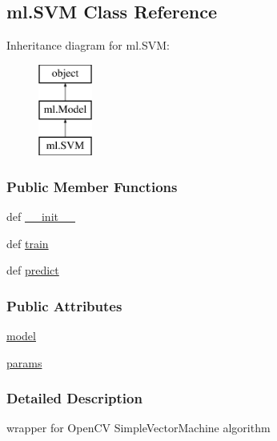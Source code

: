 \hypertarget{classml_1_1SVM}{\subsection{ml.\-S\-V\-M Class Reference}
\label{classml_1_1SVM}
}
Inheritance diagram for ml.\-S\-V\-M\-:\begin{figure}[H]
\begin{center}
\leavevmode
\includegraphics[height=3.000000cm]{classml_1_1SVM}
\end{center}
\end{figure}
\subsubsection*{Public Member Functions}
\begin{DoxyCompactItemize}
\item 
def \hyperlink{classml_1_1SVM_a9979e4fb45c9bded660ba85c52c8f89b}{\-\_\-\-\_\-init\-\_\-\-\_\-}
\item 
def \hyperlink{classml_1_1SVM_a77dccd7a880a017ee6b63e81559c2129}{train}
\item 
def \hyperlink{classml_1_1SVM_a9d74e8e4fe3970c431f0b70b6d8671f8}{predict}
\end{DoxyCompactItemize}
\subsubsection*{Public Attributes}
\begin{DoxyCompactItemize}
\item 
\hyperlink{classml_1_1SVM_a5c0a464afd647ab9ee939f3aa9512dd6}{model}
\item 
\hyperlink{classml_1_1SVM_a7e4bb51252d61327c0ad7675033fe959}{params}
\end{DoxyCompactItemize}


\subsubsection{Detailed Description}
\begin{DoxyVerb}wrapper for OpenCV SimpleVectorMachine algorithm\end{DoxyVerb}
 


